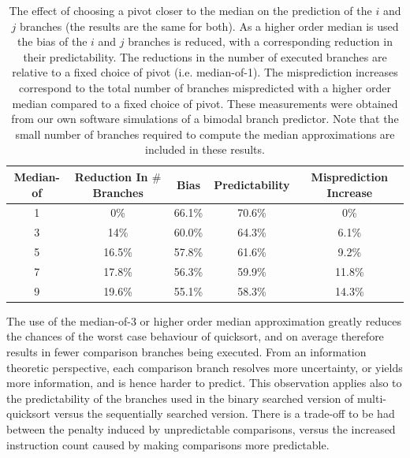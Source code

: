 \documentclass[acmtocl]{acmtrans2m}
\begin{document}
\begin{table}
\begin{tabular}{|c|c|c|c|c|}
\hline
Median-of & Reduction In $\#$Branches & Bias    & Predictability & Misprediction Increase \\
\hline                                                                                   
1         & 0\%                       & 66.1\%  & 70.6\%         & 0\%                    \\
\hline
3         & 14\%                      & 60.0\%  & 64.3\%         & 6.1\%                  \\
\hline
5         & 16.5\%                    & 57.8\%  & 61.6\%         & 9.2\%                  \\                     
\hline
7         & 17.8\%                    & 56.3\%  & 59.9\%         & 11.8\%                 \\
\hline
9         & 19.6\%                    & 55.1\% & 58.3\%          & 14.3\%                 \\
\hline
\end{tabular}
\caption{The effect of choosing a pivot closer to the median on the prediction
of the $i$ and $j$ branches (the results are the same for both). As a higher
order median is used the bias of the $i$ and $j$ branches is reduced, with a
corresponding reduction in their predictability.  The reductions in the number
of executed branches are relative to a fixed choice of pivot (i.e. median-of-1).
The misprediction increases correspond to the total number of branches
mispredicted with a higher order median compared to a fixed choice of pivot.
These measurements were obtained from our own software simulations of a bimodal
branch predictor. Note that the small number of branches required to compute the
median approximations are included in these results.}
\label{median_table} 
\end{table}

The use of the median-of-3 or higher order median approximation greatly reduces
the chances of the worst case behaviour of quicksort, and on average therefore
results in fewer comparison branches being executed. From an information
theoretic perspective, each comparison branch resolves more uncertainty, or
yields more information, and is hence harder to predict. This observation
applies also to the predictability of the branches used in the binary searched
version of multi-quicksort versus the sequentially searched version. There is a
trade-off to be had between the penalty induced by unpredictable comparisons,
versus the increased instruction count caused by making comparisons more
predictable.
\end{document}
